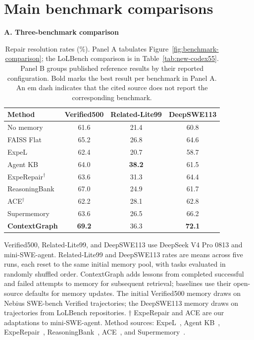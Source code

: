 \section{Main benchmark comparisons}
\label{sec:main-results-overview}
\begin{table}[!htbp]
\centering
\caption{Repair resolution rates (\%). Panel A tabulates
Figure~\ref{fig:benchmark-comparison}; the LoLBench comparison is in
Table~\ref{tab:new-codex55}. Panel B groups published reference results by
their reported configuration. Bold marks the best result per benchmark in
Panel A. An em dash indicates that the cited source does not report the
corresponding benchmark.}
\label{tab:main-results-overview}
\small
\setlength{\tabcolsep}{5pt}

\textbf{A. Three-benchmark comparison}\\[3pt]
\begin{tabular}{lccc}
\toprule
Method & Verified500 & Related-Lite99 & DeepSWE113 \\
\midrule
No memory & 61.6 & 21.4 & 60.8 \\
FAISS Flat & 65.2 & 26.8 & 64.6 \\
ExpeL & 62.4 & 20.7 & 58.7 \\
Agent KB & 64.0 & \textbf{38.2} & 61.5 \\
ExpeRepair$^\dagger$ & 63.6 & 31.3 & 64.4 \\
ReasoningBank & 67.0 & 24.9 & 61.7 \\
ACE$^\dagger$ & 62.2 & 28.1 & 62.8 \\
Supermemory & 63.6 & 26.5 & 66.2 \\
\textbf{ContextGraph} & \textbf{69.2} & 36.3 & \textbf{72.1} \\
\bottomrule
\end{tabular}

\smallskip
\begin{minipage}{\linewidth}\footnotesize
Verified500, Related-Lite99, and DeepSWE113 use DeepSeek V4 Pro 0813 and mini-SWE-agent.
Related-Lite99 and DeepSWE113 rates are means across five runs, each
reset to the same initial memory pool, with tasks evaluated in randomly
shuffled order.
ContextGraph adds lessons from completed successful and failed attempts
to memory for subsequent retrieval; baselines use their open-source
defaults for memory updates. The initial Verified500 memory draws on
Nebius SWE-bench Verified trajectories; the DeepSWE113 memory draws on
trajectories from LoLBench repositories.
$\dagger$ ExpeRepair and ACE are our adaptations to mini-SWE-agent.
Method sources: ExpeL~\citep{expel2024}, Agent KB~\citep{agentkb2025},
ExpeRepair~\citep{experepair2026}, ReasoningBank~\citep{reasoningbank2026},
ACE~\citep{ace2026}, and Supermemory~\citep{supermemoryreport2026}.
\end{minipage}


\end{table}
